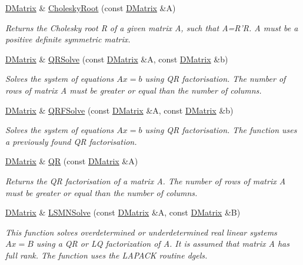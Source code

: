 \begin{DoxyCompactItemize}
\hyperlink{classDMatrix}{DMatrix} \& \hyperlink{classDMatrix_af65da2b06dfaa39404003f6a7d09121b}{CholeskyRoot} (const \hyperlink{classDMatrix}{DMatrix} \&A)
\begin{DoxyCompactList}\small\item\em Returns the Cholesky root R of a given matrix A, such that A=R'R. A must be a positive definite symmetric matrix. \item\end{DoxyCompactList}\item 
\hyperlink{classDMatrix}{DMatrix} \& \hyperlink{classDMatrix_a3b4d3e101ff20bd05a1908437481bef0}{QRSolve} (const \hyperlink{classDMatrix}{DMatrix} \&A, const \hyperlink{classDMatrix}{DMatrix} \&b)
\begin{DoxyCompactList}\small\item\em Solves the system of equations $ A x = b $ using QR factorisation. The number of rows of matrix A must be greater or equal than the number of columns. \item\end{DoxyCompactList}\item 
\hyperlink{classDMatrix}{DMatrix} \& \hyperlink{classDMatrix_a3a0e406e05efdd9374cc918645053b27}{QRFSolve} (const \hyperlink{classDMatrix}{DMatrix} \&A, const \hyperlink{classDMatrix}{DMatrix} \&b)
\begin{DoxyCompactList}\small\item\em Solves the system of equations $ A x = b $ using QR factorisation. The function uses a previously found QR factorisation. \item\end{DoxyCompactList}\item 
\hyperlink{classDMatrix}{DMatrix} \& \hyperlink{classDMatrix_a31d884a31b9ef5b534de344af01e2a38}{QR} (const \hyperlink{classDMatrix}{DMatrix} \&A)
\begin{DoxyCompactList}\small\item\em Returns the QR factorisation of a matrix A. The number of rows of matrix A must be greater or equal than the number of columns. \item\end{DoxyCompactList}\item 
\hyperlink{classDMatrix}{DMatrix} \& \hyperlink{classDMatrix_aba0583d31407f78cfe1176d74d03fa59}{LSMNSolve} (const \hyperlink{classDMatrix}{DMatrix} \&A, const \hyperlink{classDMatrix}{DMatrix} \&B)
\begin{DoxyCompactList}\small\item\em This function solves overdetermined or underdetermined real linear systems $ A x = B $ using a QR or LQ factorization of A. It is assumed that matrix A has full rank. The function uses the LAPACK routine dgels. \item\end{DoxyCompactList}\item 

\end{DoxyCompactItemize}
